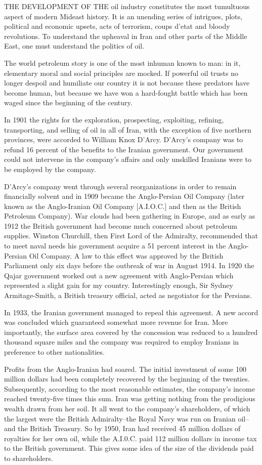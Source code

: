 THE DEVELOPMENT OF THE oil industry constitutes the most tumultuous aspect of modern Mideast history. It is an unending series of intrigues, plots, political and economic upsets, acts of terrorism, coups d'etat and bloody revolutions. To understand the upheaval in Iran and other parts of the Middle East, one must understand the politics of oil. 

The world petroleum story is one of the most inhuman known to man: in it, elementary moral and social principles are mocked. If powerful oil trusts no longer despoil and humiliate our country it is not because these predators have become human, but because we have won a hard-fought battle which has been waged since the beginning of the century. 

In 1901 the rights for the exploration, prospecting, exploiting, refining, transporting, and selling of oil in all of Iran, with the exception of five northern provinces, were accorded to William Knox D'Arcy. D'Arcy's company was to refund 16 percent of the benefits to the Iranian government. Our government could not intervene in the company's affairs and only unskilled Iranians were to be employed by the company. 

D’Arcy’s company went through several reorganizations in order to remain financially solvent and in 1909 became the Anglo-Persian Oil Company (later known as the Anglo-Iranian Oil Company [A.I.O.C.] and then as the British Petroleum Company). War clouds had been gathering in Europe, and as early as 1912 the British government had become much concerned about petroleum supplies. Winston Churchill, then First Lord of the Admiralty, recommended that to meet naval needs his government acquire a 51 percent interest in the Anglo-Persian Oil Company. A law to this effect was approved by the British Parliament only six days before the outbreak of war in August 1914. In 1920 the Qajar government worked out a new agreement with Anglo-Persian which represented a slight gain for my country. Interestingly enough, Sir Sydney Armitage-Smith, a British treasury official, acted as negotiator for the Persians. 

In 1933, the Iranian government managed to repeal this agreement. A new accord was concluded which guaranteed somewhat more revenue for Iran. More importantly, the surface area covered by the concession was reduced to a hundred thousand square miles and the company was required to employ Iranians in preference to other nationalities. 

Profits from the Anglo-Iranian had soared. The initial investment of some 100 million dollars had been completely recovered by the beginning of the twenties. Subsequently, according to the most reasonable estimates, the company's income reached twenty-five times this sum. Iran was getting nothing from the prodigious wealth drawn from her soil. It all went to the company's shareholders, of which the largest were the British Admiralty--the Royal Navy was run on Iranian oil--and the British Treasury. So by 1950, Iran had received 45 million dollars of royalties for her own oil, while the A.I.0.C. paid 112 million dollars in income tax to the British government. This gives some idea of the size of the dividends paid to shareholders. 

